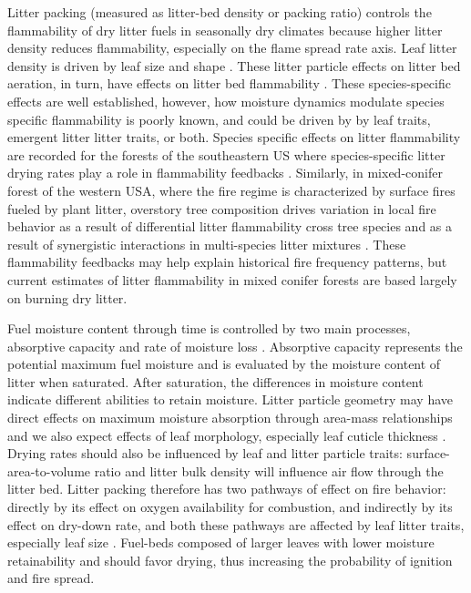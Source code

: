 \documentclass[letterpaper,12pt]{article}
\begin{document}

Litter packing (measured as litter-bed density or packing ratio) controls the
flammability of dry litter fuels in seasonally dry climates because higher
litter density reduces flammability, especially on the flame spread rate axis.
Leaf litter density is driven by leaf size and shape
\citep{Fonda+Belanger+etal-1998, Scarff+Westoby-2006, Kane+Varner+etal-2008}.
These litter particle effects on litter bed aeration, in turn, have effects on
litter bed flammability \citep{Ganteaume+Marielle+etal-2011,
  Schwilk+Caprio-2011, Kreye+Varner+etal-2013}. These species-specific effects
are well established, however, how moisture dynamics modulate species specific
flammability is poorly known, and could be driven by by leaf traits, emergent
litter litter traits, or both. Species specific effects on litter flammability
are recorded for the forests of the southeastern US \citep{Nowacki+Abrams-2008}
where species-specific litter drying rates play a role in flammability
feedbacks \citep{Kreye+Varner+etal-2013}. Similarly, in mixed-conifer forest of
the western USA, where the fire regime is characterized by surface fires fueled
by plant litter, overstory tree composition drives variation in local fire
behavior \citep{Schwilk+Caprio-2011} as a result of differential litter
flammability cross tree species and as a result of synergistic interactions in
multi-species litter mixtures \citep{Magalhaes+Schwilk-2012}. These flammability
feedbacks may help explain historical fire frequency patterns, but current
estimates of litter flammability in mixed conifer forests are based largely on
burning dry litter.

Fuel moisture content through time is controlled by two main processes,
absorptive capacity and rate of moisture loss \citep{Kreye+Kobziar+etal-2013}.
Absorptive capacity represents the potential maximum fuel moisture and is
evaluated by the moisture content of litter when saturated. After saturation,
the differences in moisture content indicate different abilities to retain
moisture. Litter particle geometry may have direct effects on maximum moisture
absorption through area-mass relationships and we also expect effects of leaf
morphology, especially leaf cuticle thickness \citep{Van_Wagner-1969}. Drying
rates should also be influenced by leaf and litter particle traits:
surface-area-to-volume ratio and litter bulk density will influence air flow
through the litter bed. Litter packing therefore has two pathways of effect on
fire behavior: directly by its effect on oxygen availability for combustion,
and indirectly by its effect on dry-down rate, and both these pathways are
affected by leaf litter traits, especially leaf size
\citep{Scarff+Westoby-2006}. Fuel-beds composed of larger leaves with lower
moisture retainability and should favor drying, thus increasing the probability
of ignition and fire spread.
\end{document}
